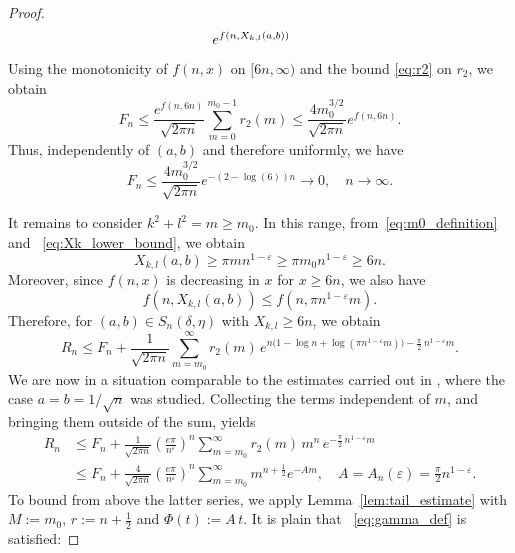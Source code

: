\documentclass[11pt]{amsart}
\numberwithin{equation}{section}
\begin{document}
\begin{proof}
\begin{equation}
        \hspace{-12pt}
        e^{f(n,X_{k,l}(a,b))}
    \end{equation}
    Using the monotonicity of $f(n,x)$ on $[6n,\infty)$ and the bound \eqref{eq:r2} on $r_2$, we obtain
    \begin{equation}
        F_n \leq  \frac{e^{f(n,6n)}}{\sqrt{2 \pi n}}  \sum_{m=0}^{m_0-1}r_2(m) \leq  \frac{4m_0^{3/2}}{\sqrt{2 \pi n}} e^{f(n,6n)}.
    \end{equation}
    Thus, independently of $(a,b)$ and therefore uniformly, we have
    \begin{equation}
        F_n \leq \frac{4 m_0^{3/2}}{\sqrt{2 \pi n}} e^{-(2-\log(6))n} \to 0, \quad n \to \infty.
    \end{equation}

    It remains to consider $k^2+l^2=m\geq m_0$. In this range, from~\eqref{eq:m0_definition} and ~\eqref{eq:Xk_lower_bound}, we obtain
    \begin{equation}
       X_{k,l}(a,b)\geq \pi m n^{1-\varepsilon} \geq \pi m_0 n^{1-\varepsilon} \geq 6n.
    \end{equation}
    Moreover, since $f(n,x)$ is decreasing in $x$ for $x \geq 6n$, we also have
    \begin{equation}
        f(n,X_{k,l}(a,b)) \leq f(n, \pi n^{1-\varepsilon}m).
    \end{equation}
    Therefore, for $(a,b) \in S_n(\delta, \eta)$ with $X_{k,l} \geq 6n$, we obtain
    \begin{equation}
        R_n \leq F_n + \frac{1}{\sqrt{2\pi n}} \sum_{m=m_0}^{\infty} r_2(m)\, e^{n\big(1-\log n+\log(\pi n^{1-\varepsilon}m)\big)-\tfrac{\pi}{2}\, n^{1-\varepsilon}m}.
    \end{equation}
    We are now in a situation comparable to the estimates carried out in \cite{MR4887696}, where the case $a=b=1/\sqrt{n}$ was studied. Collecting the terms independent of $m$, and bringing them outside of the sum, yields
    \begin{align}
        R_n 
        & \leq F_n +\frac{1}{\sqrt{2\pi n}} \left(\frac{e\pi}{n^{\varepsilon}}\right)^n \sum_{m=m_0}^{\infty} r_2(m)\, m^n\, e^{-\frac{\pi}{2}\,n^{1-\varepsilon} m}\\
        & \leq F_n + \frac{4}{\sqrt{2 \pi n}} \left(\frac{e\pi}{n^{\varepsilon}}\right)^n \sum_{m=m_0}^{\infty} m^{n+\frac{1}{2}} e^{-A m}, \quad A = A_n(\varepsilon) = \frac{\pi}{2} n^{1-\varepsilon}.
    \end{align}
  To bound from above the latter series, we apply Lemma~\ref{lem:tail_estimate} with $M:=m_0, \, r:=n+\frac{1}{2}$ and $\Phi(t):=A \, t.$ It is plain that ~\eqref{eq:gamma_def} is satisfied:

\end{proof}
\end{document}
